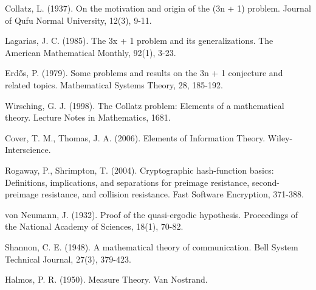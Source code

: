 \begin{thebibliography}{9}

 Collatz, L. (1937). On the motivation and origin of the (3n + 1) problem. Journal of Qufu Normal University, 12(3), 9-11.

 Lagarias, J. C. (1985). The 3x + 1 problem and its generalizations. The American Mathematical Monthly, 92(1), 3-23.

 Erdős, P. (1979). Some problems and results on the 3n + 1 conjecture and related topics. Mathematical Systems Theory, 28, 185-192.

 Wirsching, G. J. (1998). The Collatz problem: Elements of a mathematical theory. Lecture Notes in Mathematics, 1681.

 Cover, T. M., Thomas, J. A. (2006). Elements of Information Theory. Wiley-Interscience.

 Rogaway, P., Shrimpton, T. (2004). Cryptographic hash-function basics: Definitions, implications, and separations for preimage resistance, second-preimage resistance, and collision resistance. Fast Software Encryption, 371-388.

 von Neumann, J. (1932). Proof of the quasi-ergodic hypothesis. Proceedings of the National Academy of Sciences, 18(1), 70-82.

 Shannon, C. E. (1948). A mathematical theory of communication. Bell System Technical Journal, 27(3), 379-423.

 Halmos, P. R. (1950). Measure Theory. Van Nostrand.

\end{thebibliography} 